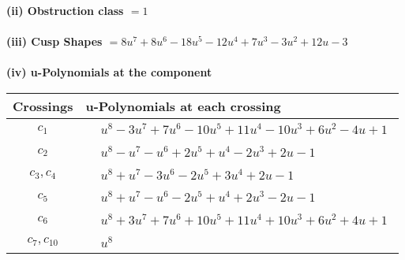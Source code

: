 \documentclass[1p]{elsarticle_modified}
\theoremstyle{definition}
\begin{document}
\flushleft \textbf{(ii) Obstruction class $= 1$}\\~\\
\flushleft \textbf{(iii) Cusp Shapes $= 8 u^7+8 u^6-18 u^5-12 u^4+7 u^3-3 u^2+12 u-3$}\\~\\
\newpage\renewcommand{\arraystretch}{1}
\flushleft \textbf{(iv) u-Polynomials at the component}\newline \\
\begin{tabular}{m{50pt}|m{274pt}}
Crossings & \hspace{64pt}u-Polynomials at each crossing \\
\hline $$\begin{aligned}c_{1}\end{aligned}$$&$\begin{aligned}
&u^8-3 u^7+7 u^6-10 u^5+11 u^4-10 u^3+6 u^2-4 u+1
\end{aligned}$\\
\hline $$\begin{aligned}c_{2}\end{aligned}$$&$\begin{aligned}
&u^8- u^7- u^6+2 u^5+u^4-2 u^3+2 u-1
\end{aligned}$\\
\hline $$\begin{aligned}c_{3},c_{4}\end{aligned}$$&$\begin{aligned}
&u^8+u^7-3 u^6-2 u^5+3 u^4+2 u-1
\end{aligned}$\\
\hline $$\begin{aligned}c_{5}\end{aligned}$$&$\begin{aligned}
&u^8+u^7- u^6-2 u^5+u^4+2 u^3-2 u-1
\end{aligned}$\\
\hline $$\begin{aligned}c_{6}\end{aligned}$$&$\begin{aligned}
&u^8+3 u^7+7 u^6+10 u^5+11 u^4+10 u^3+6 u^2+4 u+1
\end{aligned}$\\
\hline $$\begin{aligned}c_{7},c_{10}\end{aligned}$$&$\begin{aligned}
&u^8
\end{aligned}$\\

\end{tabular}
\end{document}
